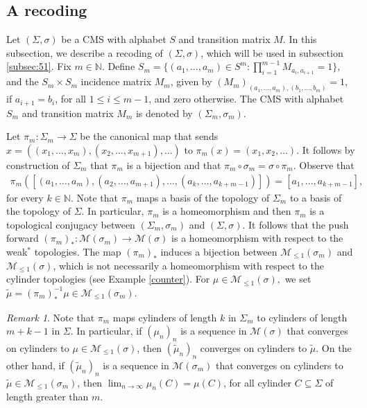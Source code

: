 \documentclass[letterpaper,11pt]{amsart}
\theoremstyle{plain}
\theoremstyle{plain}
\theoremstyle{definition}
\theoremstyle{remark}
\newtheorem{remark}{Remark}[section]
\def\N{{\mathbb N}}
\def\M{{\mathcal M}}
\begin{document}
\subsection{A recoding}\label{recode}  Let $(\Sigma,\sigma)$ be a CMS with alphabet $S$ and transition matrix $M$.  In this subsection, we describe a recoding of $(\Sigma,\sigma)$, which will be used in subsection \ref{subsec:51}. Fix $m\in \N$. Define $S_m=\{(a_1,\ldots,a_m)\in S^m: \prod_{i=1}^{m-1}M_{a_i,a_{i+1}}=1\},$ and the $S_m\times S_m$ incidence matrix $M_m$, given by $(M_m)_{(a_1,\ldots,a_m),(b_1,...,b_m)}=1$, if $a_{i+1}=b_i$, for all $1\le i\le m-1$, and zero otherwise. The CMS with alphabet $S_m$ and transition matrix $M_m$ is denoted by $(\Sigma_m,\sigma_m)$.

 Let $\pi_m:\Sigma_m\to \Sigma$ be the canonical map that sends 
 $x=((x_1,\ldots,x_{m}),(x_2,\ldots,x_{m+1}),\ldots)$ to $\pi_m(x)=(x_1,x_2,\ldots)$.  It follows by construction of $\Sigma_m$ that $\pi_m$ is a bijection and that $\pi_m\circ \sigma_m=\sigma\circ \pi_m$. Observe  that
\begin{align}\label{pim}\pi_m([(a_1,\ldots,a_m),(a_2,\ldots,a_{m+1}),\ldots,(a_{k},\ldots,a_{k+m-1})])=[a_1,\ldots,a_{k+m-1}],\end{align}
for every $k\in \N$. Note that $\pi_m$ maps a basis of the topology of $\Sigma_m$ to a basis of the topology of $\Sigma$. In particular, $\pi_m$ is a homeomorphism and then $\pi_m$ is a topological conjugacy between $(\Sigma_m,\sigma_m)$ and $(\Sigma,\sigma)$. It follows that the push forward $(\pi_m)_*:\M(\sigma_m)\to \M(\sigma)$ is a homeomorphism with respect to the weak$^*$ topologies. The map $(\pi_m)_*$ induces a bijection between  $\M_{\le 1}(\sigma_m)$ and $\M_{\le1}(\sigma)$, which is not necessarily a homeomorphism with respect to the cylinder topologies (see Example \ref{counter}). For $\mu\in \M_{\le1}(\sigma),$ we set 
$\tilde{\mu}=(\pi_m)_*^{-1}\mu\in \M_{\le 1}(\sigma_m)$.

\begin{remark}\label{rem:topm} Note that $\pi_m$ maps cylinders of length $k$ in $\Sigma_m$ to cylinders of length $m+k-1$ in $\Sigma$. In particular, if $(\mu_n)_n$ is a sequence in $\M(\sigma)$ that converges on cylinders to $\mu\in\M_{\le1}(\sigma)$, then $(\tilde{\mu}_n)_n$ converges on cylinders to $\tilde{\mu}$. On the other hand, if $(\tilde{\mu}_n)_n$ is a sequence in $\M(\sigma_m)$  that converges on cylinders to $\tilde{\mu}\in\M_{\le1}(\sigma_m)$, then $\lim_{n\to\infty}\mu_n(C)=\mu(C)$, for all cylinder $C\subseteq \Sigma$ of length greater than $m$.
\end{remark}
\end{document}

